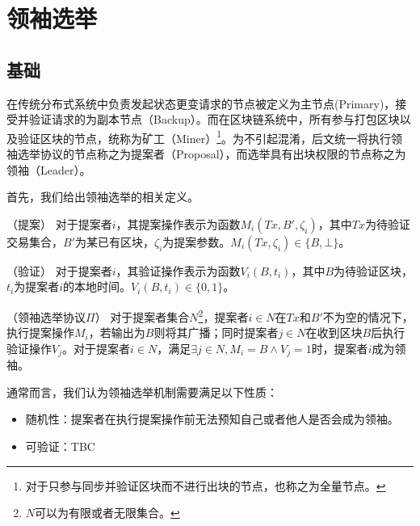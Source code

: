 \section{领袖选举}


\label{sec:leader_election}
\subsection{基础}
在传统分布式系统\cite{lamport2001paxos,castro1999practical}中负责发起状态更变请求的节点被定义为主节点(Primary)，接受并验证请求的为副本节点（Backup）。而在区块链系统中，所有参与打包区块以及验证区块的节点，统称为矿工（Miner）\footnote{对于只参与同步并验证区块而不进行出块的节点，也称之为全量节点。}。为不引起混淆，后文统一将执行领袖选举协议的节点称之为提案者（Proposal），而选举具有出块权限的节点称之为领袖（Leader）。

首先，我们给出领袖选举的相关定义。
\begin{definition}
（提案） 对于提案者$i$，其提案操作表示为函数$M_i(Tx,B',\zeta_i)$，其中$Tx$为待验证交易集合，$B'$为某已有区块，$\zeta_i$为提案参数。$M_i(Tx,\zeta_i)\in\{B,\bot\}$。
\end{definition}


\begin{definition}
（验证） 对于提案者$i$，其验证操作表示为函数$V_i(B,t_i)$，其中$B$为待验证区块，$t_i$为提案者$i$的本地时间。$V_i(B,t_i)\in\{0,1\}$。
\end{definition}

\begin{definition}
\label{def:leader_election}
（领袖选举协议$\Pi$） 对于提案者集合$N$\footnote{$N$可以为有限或者无限集合。}，提案者$i\in N$在$Tx$和$B'$不为空的情况下，执行提案操作$M_i$，若输出为$B$则将其广播；同时提案者$j \in N$在收到区块$B$后执行验证操作$V_j$。对于提案者$i\in N$，满足$\exists j\in N,M_i=B\wedge V_j=1$时，提案者$i$成为领袖。

\end{definition}



通常而言，我们认为领袖选举机制需要满足以下性质：

\begin{itemize}
  \item 随机性：提案者在执行提案操作前无法预知自己或者他人是否会成为领袖。
  \item 可验证：TBC%
\end{itemize}


